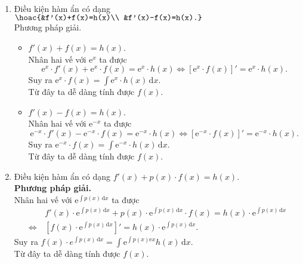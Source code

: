 \begin{dang}{~}
\begin{enumerate}[1]
		\begin{enumerate}
			\item Điều kiện hàm ẩn có dạng $\hoac{&f'(x)+f(x)=h(x)\\ &f'(x)-f(x)=h(x).}$\\
			Phương pháp giải.
			\begin{itemize}
				\item $f'(x)+f(x)=h(x)$.\\
				Nhân hai vế với $\mathrm{e}^x$ ta được $$\mathrm{e}^x \cdot f'(x)+\mathrm{e}^x \cdot f(x)=\mathrm{e}^x \cdot h(x) \Leftrightarrow\left[\mathrm{e}^x \cdot f(x)\right]'=\mathrm{e}^x \cdot h(x).$$
				Suy ra $\mathrm{e}^x \cdot f(x)=\displaystyle\int \mathrm{e}^x \cdot h(x)  \mathrm{\,d} x$.\\
				Từ đây ta dễ dàng tính được $f(x)$.
				\item $f'(x)-f(x)=h(x)$.\\
				Nhân hai vế với $\mathrm{e}^{-x}$ ta được $$\mathrm{e}^{-x} \cdot f'(x)-\mathrm{e}^{-x} \cdot f(x)=\mathrm{e}^{-x} \cdot h(x) \Leftrightarrow\left[\mathrm{e}^{-x} \cdot f(x)\right]'=\mathrm{e}^{-x} \cdot h(x).$$
				Suy ra $\mathrm{e}^{-x} \cdot f(x)=\displaystyle\int \mathrm{e}^{-x} \cdot h(x)  \mathrm{\,d} x$.\\
				Từ đây ta dễ dàng tính được $f(x)$.
			\end{itemize}
			\item Điều kiện hàm ẩn có dạng $f'(x)+p(x)\cdot f(x)=h(x)$.\\
			\textbf{Phương pháp giải.}\\
			Nhân hai vế với $\mathrm{e}^{\displaystyle\int\limits p(x) \mathrm{\,d} x}$ ta được
			\begin{align*}
				&\,f'(x) \cdot \mathrm{e}^{\displaystyle\int\limits p(x) \mathrm{\,d} x}+p(x) \cdot \mathrm{e}^{\displaystyle\int\limits p(x) \mathrm{\,d} x} \cdot f(x)=h(x) \cdot \mathrm{e}^{\displaystyle\int\limits p(x) \mathrm{\,d}x}\\
				\Leftrightarrow&\, \left[f(x) \cdot \mathrm{e}^{\displaystyle\int\limits p(x) \mathrm{\,d} x}\right]'=h(x) \cdot \mathrm{e}^{\displaystyle\int\limits p(x) \mathrm{\,d} x}.
			\end{align*}
			Suy ra $f(x) \cdot e^{\displaystyle\int p(x)\mathrm{\,d} x}=\displaystyle\int \mathrm{e}^{\displaystyle\int\limits p(x) \mathrm{e} x} h(x)  \mathrm{\,d} x$.\\
			Từ đây ta dễ dàng tính được $f(x)$.
		\end{enumerate}
	\end{enumerate}	
\end{dang}
